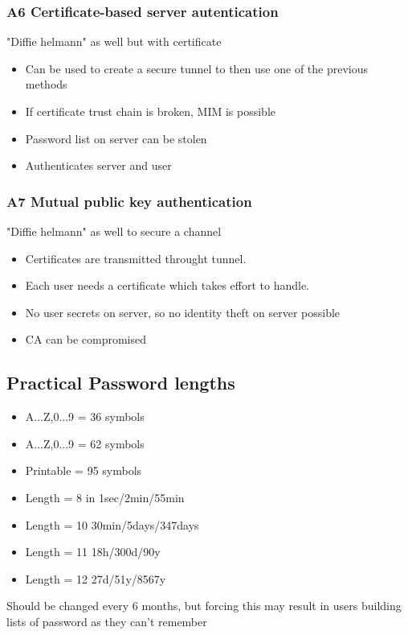 \documentclass[12pt]{article}
\begin{document}
\subsubsection*{A6 Certificate-based server autentication}
"Diffie helmann" as well but with certificate

\begin{itemize}
    \item Can be used to create a secure tunnel to then use one of the previous methods
    \item If certificate trust chain is broken, MIM is possible
    \item Password list on server can be stolen
    \item Authenticates server and user
\end{itemize}

\subsubsection*{A7 Mutual public key authentication}
"Diffie helmann" as well to secure a channel

\begin{itemize}
    \item Certificates are transmitted throught tunnel.
    \item Each user needs a certificate which takes effort to handle.
    \item No user secrets on server, so no identity theft on server possible
    \item CA can be compromised
\end{itemize}

\subsection*{Practical Password lengths}
\begin{itemize}
    \item A...Z,0...9 = 36 symbols
    \item A...Z,0...9 = 62 symbols
    \item Printable = 95 symbols
    \item Length = 8 in 1sec/2min/55min
    \item Length = 10 30min/5days/347days
    \item Length = 11 18h/300d/90y
    \item Length = 12 27d/51y/8567y
\end{itemize}
Should be changed every 6 months, but forcing this may result in users building lists of password as they can't remember
\end{document}
